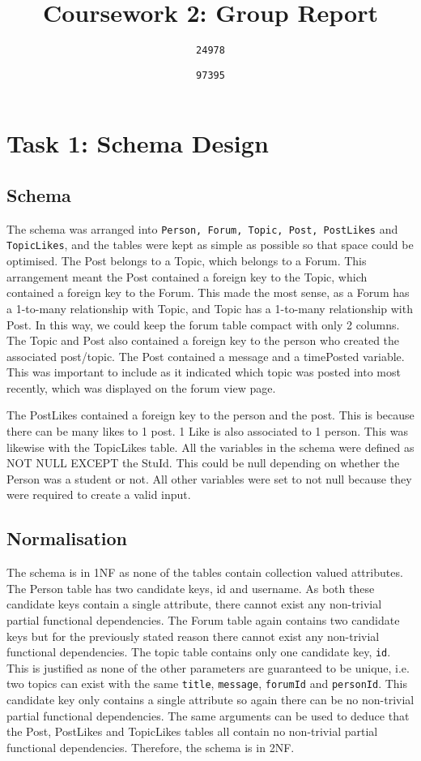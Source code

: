 \documentclass{article}
\begin{document}
\author{
	\texttt{24978}
	\and
	\texttt{97395}
}
\title{Coursework 2: Group Report}
\maketitle

\section*{Task 1: Schema Design}

\subsection*{Schema}

The schema was arranged into \texttt{Person, Forum, Topic, Post, PostLikes} and \texttt{TopicLikes}, and the tables were kept as simple as possible so that space could be optimised.
The Post belongs to a Topic, which belongs to a Forum. This arrangement meant the Post contained a foreign key to the Topic, which contained a foreign key to the Forum. This made the most sense, as a Forum has a 1-to-many relationship with Topic, and Topic has a 1-to-many relationship with Post. In this way, we could keep the forum table compact with only 2 columns.
The Topic and Post also contained a foreign key to the person who created the associated post/topic.
The Post contained a message and a timePosted variable. This was important to include as it indicated which topic was posted into most recently, which was displayed on the forum view page.

The PostLikes contained a foreign key to the person and the post. This is because there can be many likes to 1 post. 1 Like is also associated to 1 person.
This was likewise with the TopicLikes table.
All the variables in the schema were defined as NOT NULL EXCEPT the StuId. This could be null depending on whether the Person was a student or not. All other variables were set to not null because they were required to create a valid input.


\subsection*{Normalisation}

The schema is in 1NF as none of the tables contain collection valued attributes. 
The Person table has two candidate keys, id and username. As both these candidate keys contain a single attribute, there cannot exist any non-trivial partial functional dependencies. The Forum table again contains two candidate keys but for the previously stated reason there cannot exist any non-trivial functional dependencies. The topic table contains only one candidate key, \texttt{id}. This is justified as none of the other parameters are guaranteed to be unique, i.e. two topics can exist with the same \texttt{title}, \texttt{message}, \texttt{forumId} and \texttt{personId}. This candidate key only contains a single attribute so again there can be no non-trivial partial functional dependencies. The same arguments can be used to deduce that the Post, PostLikes and TopicLikes tables all contain no non-trivial partial functional dependencies. Therefore, the schema is in 2NF.
\end{document}
